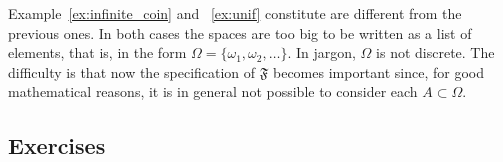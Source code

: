 	Example~\ref{ex:infinite_coin} and ~\ref{ex:unif} constitute are different from the previous ones. In both cases the spaces are too big to be written as a list of elements, that is, in the form $\Omega = \{ \omega_1 , \omega_2, \ldots \}$. In jargon, $\Omega$ is not discrete. The difficulty is that now the specification of $\mathfrak F$ becomes important since, for good  mathematical reasons, it is in general not possible to consider each $A \subset \Omega$.

%









\subsection{Exercises}


